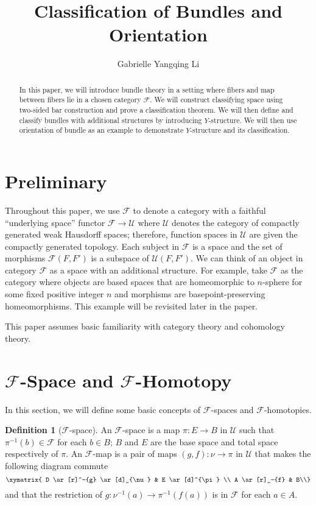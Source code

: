 \documentclass[psamsfonts]{amsart}
\title{Classification of Bundles and Orientation}
\author{Gabrielle Yangqing Li}
\theoremstyle{definition}
\newtheorem{defn}[thm]{Definition}
\theoremstyle{remark}
\numberwithin{equation}{section}
\begin{document}
\begin{abstract}
In this paper, we will introduce bundle theory in a setting where fibers and map between fibers lie in a chosen category $\mathcal{F}$. We will construct classifying space using two-sided bar construction and prove a classification theorem. We will then define and classify bundles with additional structures by introducing $Y$-structure. We will then use orientation of bundle as an example to demonstrate $Y$-structure and its classification. 


\end{abstract}

\maketitle

\tableofcontents





\section{Preliminary}
\label{sec:prelim}
Throughout this paper, we use $\mathcal{F}$ to denote a category with a faithful ``underlying space'' functor $\mathcal{F} \rightarrow \mathcal{U}$ where $\mathcal{U}$ denotes the category of compactly generated weak Hausdorff spaces; therefore, function spaces in $\mathcal{U}$ are given the compactly generated topology.  Each subject in $\mathcal{F}$ is a space and the set of morphisms $\mathcal{F}(F, F')$ is a subspace of $\mathcal{U}(F, F')$. We can think of an object in category $\mathcal{F}$ as a space with an additional structure. For example, take $\mathcal{F}$ as the category where objects are based spaces that are homeomorphic to $n$-sphere for some fixed positive integer $n$ and morphisms are basepoint-preserving homeomorphisms. This example will be revisited later in the paper.

This paper assumes basic familiarity with category theory and cohomology theory.

\section{$\mathcal{F}$-Space and $\mathcal{F}$-Homotopy}
In this section, we will define some basic concepts of $\mathcal{F}$-spaces and $\mathcal{F}$-homotopies. 

\begin{defn}[$\mathcal{F}$-space]
An $\mathcal{F}$-space is a map $\pi: E \rightarrow B$ in $\mathcal{U}$ such that $\pi^{-1}(b) \in \mathcal{F}$ for each $b \in B$; $B$ and $E$ are the base space and total space respectively of $\pi$. An $\mathcal{F}$-map is a pair of maps $(g, f): \nu \rightarrow \pi$ in $\mathcal{U}$ that makes the following diagram commute
\[\xymatrix{
D \ar[r]^-{g} \ar[d]_{\nu} & E \ar[d]^{\pi} \\
A \ar[r]_-{f} & B\\} \]
and that the restriction of $g: \nu^{-1}(a) \rightarrow \pi^{-1}(f(a))$ is in $\mathcal{F}$ for each $a \in A$.
\end{defn}
\end{document}
